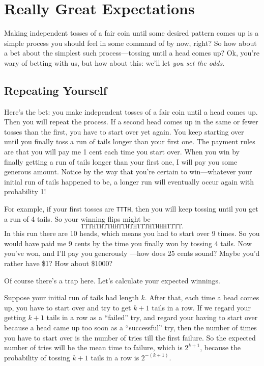 \section{Really Great Expectations}\label{infinite_expect_sec}

Making independent tosses of a fair coin until some desired pattern
comes up is a simple process you should feel in some command of by
now, right?  So how about a bet about the simplest such
process---tossing until a head comes up?  Ok, you're wary of betting
with us, but how about this: we'll let \emph{you set the odds}.

\subsection{Repeating Yourself}\label{infinite_repeat_subsec}
Here's the bet: you make independent tosses of a fair coin until a
head comes up.  Then you will repeat the process.  If a second head
comes up in the same or fewer tosses than the first, you have to start
over yet again.  You keep starting over until you finally toss a run
of tails longer than your first one.  The payment rules are that you
will pay me 1 cent each time you start over.  When you win by finally
getting a run of tails longer than your first one, I will pay you some
generous amount.  Notice by the way that you're certain to
win---whatever your initial run of tails happened to be, a longer run
will eventually occur again with probability 1!

For example, if your first tosses are \texttt{TTTH}, then you will
keep tossing until you get a run of 4 tails.  So your winning
flips might be
\[
\texttt{TTTHTHTTHHTTHTHTTTHTHHHTTTT}.
\]
In this run there are 10 heads, which means you had to start over 9
times.  So you would have paid me 9 cents by the time you finally won
by tossing 4 tails.  Now you've won, and I'll pay you generously
---how does 25 cents sound?  Maybe you'd rather have \$1?  How about
\$1000?

Of course there's a trap here.  Let's calculate your expected
winnings.

Suppose your initial run of tails had length $k$.  After that, each
time a head comes up, you have to start over and try to get $k+1$ tails
in a row.  If we regard your getting $k+1$ tails in a row as a
``failed'' try, and regard your having to start over because a head
came up too soon as a ``successful'' try, then the number of times you
have to start over is the number of tries till the first failure.  So
the expected number of tries will be the mean time to failure, which is
$2^{k+1}$, because the probability of tossing $k+1$ tails in a row is
$2^{-(k+1)}$.

